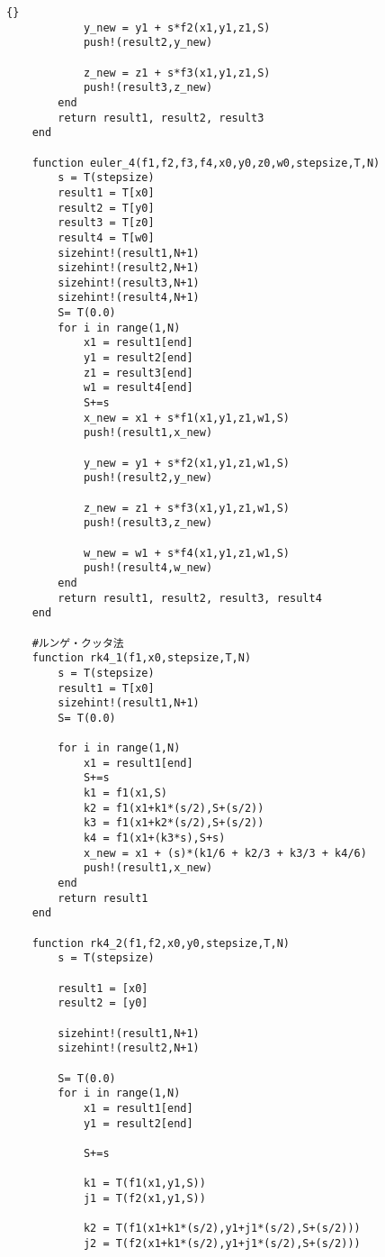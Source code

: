 \begin{lstlisting}[caption =\text{numerical\_scheme.jl}, label = a]{}
            y_new = y1 + s*f2(x1,y1,z1,S)
            push!(result2,y_new)

            z_new = z1 + s*f3(x1,y1,z1,S)
            push!(result3,z_new)
        end
        return result1, result2, result3
    end

    function euler_4(f1,f2,f3,f4,x0,y0,z0,w0,stepsize,T,N)
        s = T(stepsize)
        result1 = T[x0]
        result2 = T[y0]
        result3 = T[z0] 
        result4 = T[w0]
        sizehint!(result1,N+1)
        sizehint!(result2,N+1)
        sizehint!(result3,N+1)
        sizehint!(result4,N+1)
        S= T(0.0)
        for i in range(1,N)
            x1 = result1[end]
            y1 = result2[end]
            z1 = result3[end]
            w1 = result4[end]
            S+=s
            x_new = x1 + s*f1(x1,y1,z1,w1,S)
            push!(result1,x_new)

            y_new = y1 + s*f2(x1,y1,z1,w1,S)
            push!(result2,y_new)

            z_new = z1 + s*f3(x1,y1,z1,w1,S)
            push!(result3,z_new)

            w_new = w1 + s*f4(x1,y1,z1,w1,S)
            push!(result4,w_new)
        end
        return result1, result2, result3, result4
    end

    #ルンゲ・クッタ法
    function rk4_1(f1,x0,stepsize,T,N)
        s = T(stepsize)
        result1 = T[x0]
        sizehint!(result1,N+1)
        S= T(0.0)

        for i in range(1,N)
            x1 = result1[end]
            S+=s
            k1 = f1(x1,S)
            k2 = f1(x1+k1*(s/2),S+(s/2))
            k3 = f1(x1+k2*(s/2),S+(s/2))
            k4 = f1(x1+(k3*s),S+s)
            x_new = x1 + (s)*(k1/6 + k2/3 + k3/3 + k4/6)
            push!(result1,x_new)
        end
        return result1
    end

    function rk4_2(f1,f2,x0,y0,stepsize,T,N)
        s = T(stepsize)

        result1 = [x0]
        result2 = [y0]

        sizehint!(result1,N+1)
        sizehint!(result2,N+1)

        S= T(0.0)
        for i in range(1,N)
            x1 = result1[end]
            y1 = result2[end]

            S+=s

            k1 = T(f1(x1,y1,S))
            j1 = T(f2(x1,y1,S))

            k2 = T(f1(x1+k1*(s/2),y1+j1*(s/2),S+(s/2)))
            j2 = T(f2(x1+k1*(s/2),y1+j1*(s/2),S+(s/2)))


\end{lstlisting}
